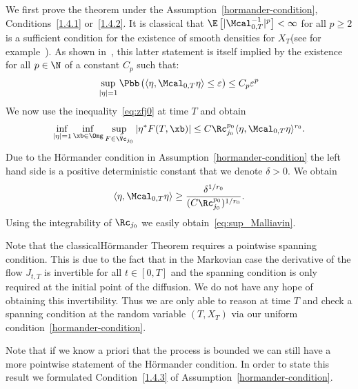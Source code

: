 We first prove the theorem under the Assumption~\ref{hormander-condition}, Conditions~\eqref{1.4.1} or~\eqref{1.4.2}. It is classical that $ \E\left[| \Mcal_{0,T}^{-1}|^p\right]<\infty$ for all $p\geq 2$ is a sufficient condition for the existence of smooth densities for $X_T$(see for example~\cite[Theorem~2.1.4]{nualart1988stochastic}). As shown in~\cite[Lemma~4.7]{Hairer11}, this latter statement is itself implied by the existence for all $p \in \N$ of a constant $C_p$ such that:
\begin{equation}\label{eq:sup_Malliavin}
\sup_{|\eta| = 1} \Pbb\left(\langle \eta, \Mcal_{0,T} \eta \rangle \leq \varepsilon \right) \leq C_p \varepsilon^p
\end{equation}
We now use the inequality~\eqref{eq:zfj0} at time $T$ and obtain
\[
\inf_{|\eta|=1}\inf_{\xb\in \Omg} \sup_{F\in \bar \Vc_{j_0}} |\eta^* F(T,\xb)|\leq C\Rc_{j_0}^{p_0}\langle \eta, \Mcal_{0,T} \eta \rangle^{r_0}.
\]
Due to the H\"ormander condition in Assumption~\ref{hormander-condition} the left hand side is a positive deterministic constant that we denote $\delta>0$. We obtain
\[
\langle \eta, \Mcal_{0,T} \eta \rangle\geq\frac{\delta^{1/r_0}}{(C\Rc_{j_0}^{p_0})^{1/r_0}}.
\]
Using the integrability of $\Rc_{j_0}$ we easily obtain~\eqref{eq:sup_Malliavin}.

\begin{rema}
Note that the classical\linebreak H\"ormander Theorem requires a pointwise spanning condition. This is due to the fact that in the Markovian case the derivative of the flow $J_{t,T}$ is invertible for all $t\in[0,T]$ and the spanning condition is only required at the initial point of the diffusion. We do not have any hope of obtaining this invertibility. Thus we are only able to reason at time $T$ and check a spanning condition at the random variable $(T,X_T)$ via our uniform condition~\ref{hormander-condition}.

Note that if we know a priori that the process is bounded we can still have a more pointwise statement of the H\"ormander condition. In order to state this result we formulated Condition~\eqref{1.4.3} of Assumption~\ref{hormander-condition}.
\end{rema}

